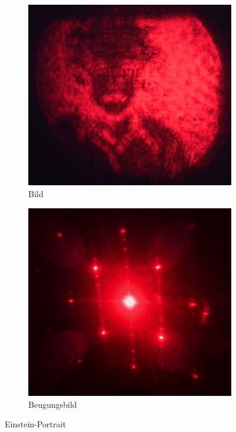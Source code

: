 \begin{figure}[p]
	\centering
	\begin{subfigure}[b]{0.49\textwidth}
		\includegraphics[width=\textwidth]{data/optics/06_Einstein_Bild}
		\caption{Bild}				\label{fig:Einstein_B}
	\end{subfigure}
	\begin{subfigure}[b]{0.49\textwidth}
		\includegraphics[width=\textwidth]{data/optics/06_Einstein_Beugung}
		\caption{Beugungsbild} 		\label{fig:Einstein_BG}
	\end{subfigure}
	\caption{Einstein-Portrait}			\label{fig:Einstein}
	\vspace{-1em}
\end{figure}

